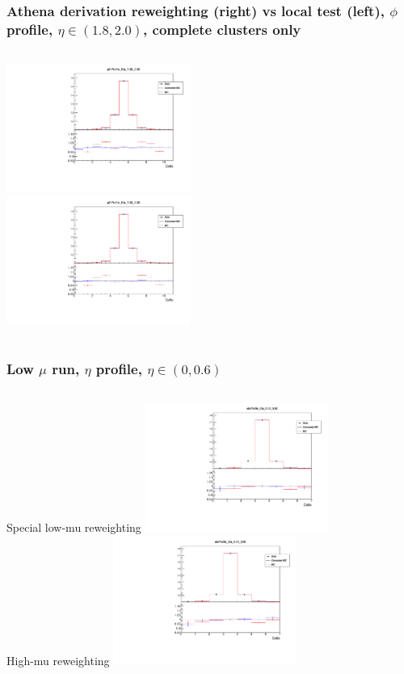 \documentclass{beamer}
\begin{document}
\begin{frame}
\frametitle{Athena derivation reweighting (right) vs local test (left), $\phi$ profile, $\eta \in (1.8, 2.0)$, complete clusters only}

\begin{columns}[t]

\centering
\includegraphics[width=6cm]{phiProfile_Eta_18_20_Athena.pdf}\\
\centering
\includegraphics[width=6cm]{phiProfile_Rew_Eta_18_20_Local_Rew_noBS.pdf}\\
\end{columns}
\end{frame}
\begin{frame}
\frametitle{Low $\mu$ run, $\eta$ profile, $\eta \in (0,0.6)$}

\begin{columns}[t]

\centering
\normalsize{Special low-mu reweighting}
\includegraphics[width=6cm]{etaProfile_Rew_Eta_0_6_lowmu_13TeV_LocalWB.pdf}\\
\centering
\normalsize{High-mu reweighting}
\includegraphics[width=6cm]{etaProfile_Eta_0_6_lowmu_13TeV_AthenaWB.pdf}\\
\end{columns}
\end{frame}
\end{document}
